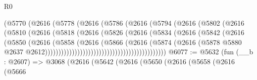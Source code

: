 \begin{lexlean}{R0}
\begin{coremodule}
                                    (@5770
                                      (@2616
                                        (@5778
                                          (@2616
                                            (@5786
                                              (@2616
                                                (@5794
                                                  (@2616
                                                    (@5802
                                                      (@2616
                                                        (@5810
                                                          (@2616
                                                            (@5818
                                                              (@2616
                                                                (@5826
                                                                  (@2616
                                                                    (@5834
                                                                      (@2616
                                                                        (@5842
                                                                          (@2616
                                                                            (@5850
                                                                              (@2616
                                                                                (@5858
                                                                                  (@2616
                                                                                    (@5866
                                                                                      (@2616
                                                                                        (@5874
                                                                                          (@2616
                                                                                            (@5878
                                                                                              @5880
                                                                                              @2637
                                                                                              @2612)))))))))))))))))))))))))))))))))))))))))))))
@6077 := @5632
    (fun (__b : @2607) =>
    @3068
      (@2616
        (@5642
          (@2616
            (@5650
              (@2616
                (@5658
                  (@2616
                    (@5666

\end{coremodule}
\end{lexlean}
